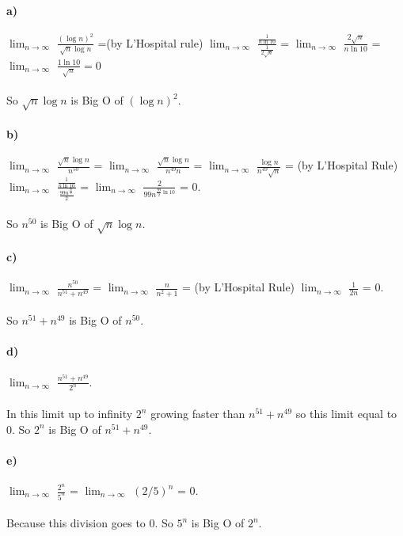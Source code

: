 \documentclass[12pt]{article}
\begin{document}
\paragraph{a)} $\lim_{n\to\infty}$ $\frac{(\log{n})^2}{\sqrt{n}\log{n}}$ =(by L'Hospital rule) $\lim_{n\to\infty}$ $\frac{\frac{1}{n \ln{10}}}{\frac{1}{2\sqrt{n}}}$ = $\lim_{n\to\infty}$ $\frac{2\sqrt{n}}{n\ln{10}}$ = $\lim_{n\to\infty}$ $\frac{1\ln{10}}{\sqrt{n}} = 0$\\ 
\\
So $\sqrt{n}\log{n}$ is Big O of $(\log{n})^2$.
\paragraph{b)}  $\lim_{n\to\infty}$ $\frac{\sqrt{n}\log{n}}{n^{50}}$ = $\lim_{n\to\infty}$ $\frac{\sqrt{n}\log{n}}{n^{49} n}$ = $\lim_{n\to\infty}$ $\frac{\log{n}}{n^{49} \sqrt{n}}$ = (by L'Hospital Rule) $\lim_{n\to\infty}$ $\frac{\frac{1}{n \ln{10}}}{\frac{99 n^{\frac{97}{2}}}{2}}$ = $\lim_{n\to\infty}$ $\frac{2}{99n^{\frac{99}{2}\ln{10}}}$ = $0$. \\
\\
So $n^{50}$ is Big O of $\sqrt{n}\log{n}$.
\paragraph{c)} $\lim_{n\to\infty}$ $\frac{n^{50}}{n^{51}+n^{49}}$ = $\lim_{n\to\infty}$ $\frac{n}{n^{2}+1}$ = (by L'Hospital Rule) $\lim_{n\to\infty}$ $\frac{1}{2n}$ = 0. \\
\\
So $n^{51}+n^{49}$ is Big O of $n^{50}$.
\paragraph{d)} $\lim_{n\to\infty}$ $\frac{n^{51}+n^{49}}{2^{n}}$. \\
\\
In this limit up to infinity $2^{n}$ growing faster than $n^{51}+n^{49}$ so this limit equal to 0. So $2^{n}$ is Big O of $n^{51}+n^{49}$.
\paragraph{e)} $\lim_{n\to\infty}$ $\frac{2^{n}}{5^{n}}$ = $\lim_{n\to\infty}$ $(2/5)^{n}$ = 0. \\
\\
Because this division goes to 0. So $5^{n}$ is Big O of $2^{n}$.
\end{document}
